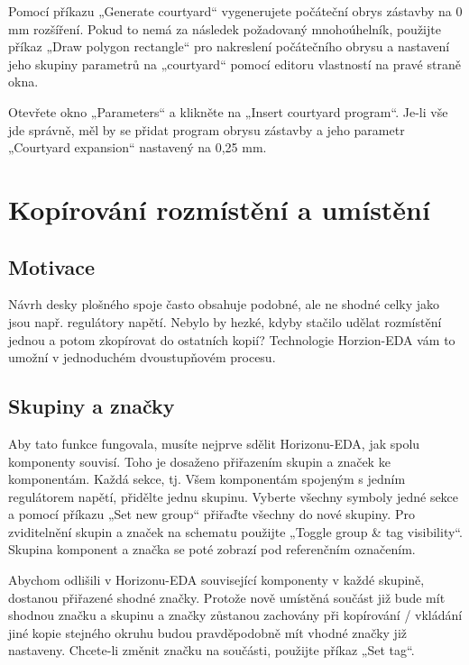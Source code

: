 \documentclass[letterpaper,10pt,czech]{sphinxmanual}
\begin{document}
Pomocí příkazu „Generate courtyard“ vygenerujete počáteční obrys zástavby na
0 mm rozšíření. Pokud to nemá za následek požadovaný mnohoúhelník, použijte
příkaz „Draw polygon rectangle“ pro nakreslení počátečního obrysu a nastavení
jeho skupiny parametrů na „courtyard“ pomocí editoru vlastností na
pravé straně okna.

Otevřete okno „Parameters“ a klikněte na „Insert courtyard program“. Je-li
vše jde správně, měl by se přidat program obrysu zástavby a jeho
parametr „Courtyard expansion“ nastavený na 0,25 mm.


\chapter{Kopírování rozmístění a umístění}
\label{\detokenize{copy-layout-placement:kopirovani-rozmisteni-a-umisteni}}\label{\detokenize{copy-layout-placement::doc}}

\section{Motivace}
\label{\detokenize{copy-layout-placement:motivace}}
Návrh desky plošného spoje často obsahuje podobné, ale ne shodné celky jako jsou např. regulátory napětí. Nebylo by hezké, kdyby stačilo udělat rozmístění jednou a potom zkopírovat do ostatních kopií? Technologie Horzion-EDA vám to umožní v jednoduchém dvoustupňovém procesu.


\section{Skupiny a značky}
\label{\detokenize{copy-layout-placement:skupiny-a-znacky}}
Aby tato funkce fungovala, musíte nejprve sdělit Horizonu-EDA, jak spolu komponenty souvisí. Toho je dosaženo přiřazením skupin a značek ke komponentám. Každá sekce, tj. Všem komponentám spojeným s
jedním regulátorem napětí, přidělte jednu skupinu. Vyberte všechny symboly jedné sekce a pomocí příkazu „Set new group“ přiřaďte všechny do nové skupiny. Pro zviditelnění skupin a značek na schematu použijte „Toggle group \& tag visibility“. Skupina komponent a značka se poté zobrazí pod referenčním označením.

Abychom odlišili v Horizonu-EDA související komponenty v každé skupině, dostanou přiřazené shodné značky. Protože nově umístěná součást již bude mít shodnou značku a skupinu a značky zůstanou zachovány při kopírování / vkládání jiné kopie stejného okruhu budou pravděpodobně mít vhodné značky již nastaveny. Chcete-li změnit značku na součásti, použijte příkaz „Set tag“.
\end{document}
